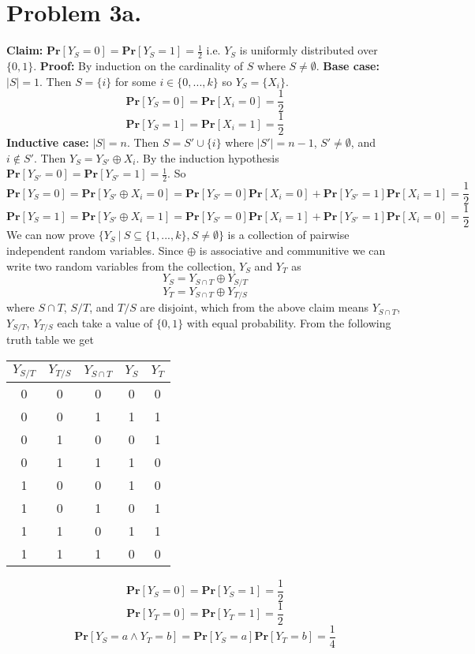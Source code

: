 \documentclass[12pt]{article}
\begin{document}
\section*{Problem 3a.}
\textbf{Claim:} $\textbf{Pr}[Y_S = 0] = \textbf{Pr}[Y_S = 1] = \frac{1}{2}$
i.e. $Y_S$ is uniformly distributed over $\{0,1\}$.
\vspace{2mm}
\newline
\textbf{Proof:} By induction on the cardinality of $S$ where $S \neq \emptyset$.
\newline
\textbf{Base case:} $|S| = 1$. Then $S = \{i\}$ for some $i \in \{0,...,k\}$
so $Y_S = \{X_i\}$.
$$\textbf{Pr}[Y_S = 0] = \textbf{Pr}[X_i = 0] = \frac{1}{2}$$
$$\textbf{Pr}[Y_S = 1] = \textbf{Pr}[X_i = 1] = \frac{1}{2}$$
\newline
\textbf{Inductive case:} $|S| = n$. Then $S = S' \cup \{i\}$ where
$|S'| = n-1$, $S' \neq \emptyset$, and $i \notin S'$. Then
$Y_S = Y_{S'} \oplus X_i$. By the induction hypothesis 
$\textbf{Pr}[Y_{S'} = 0] = \textbf{Pr}[Y_{S'} = 1] = \frac{1}{2}$.
So
$$\textbf{Pr}[Y_S = 0] = \textbf{Pr}[Y_{S'} \oplus X_i = 0] =
\textbf{Pr}[Y_{S'} = 0]\textbf{Pr}[X_i = 0] +
\textbf{Pr}[Y_{S'} = 1]\textbf{Pr}[X_i = 1] = \frac{1}{2}$$
$$\textbf{Pr}[Y_S = 1] = \textbf{Pr}[Y_{S'} \oplus X_i = 1] =
\textbf{Pr}[Y_{S'} = 0]\textbf{Pr}[X_i = 1] +
\textbf{Pr}[Y_{S'} = 1]\textbf{Pr}[X_i = 0] = \frac{1}{2}$$
\newline
We can now prove $\{Y_S\ |\ S\subseteq \{1,...,k\}, S\neq\emptyset \}$ is a
collection of pairwise independent random variables. Since $\oplus$ is
associative and communitive we can write two random variables from the
collection, $Y_S$ and $Y_T$ as
$$Y_S = Y_{S\cap T} \oplus Y_{S/T}$$
$$Y_T = Y_{S\cap T} \oplus Y_{T/S}$$
where $S\cap T$, $S/T$, and $T/S$ are disjoint, which from the above claim means
$Y_{S\cap T}$, $Y_{S/T}$, $Y_{T/S}$ each take a value of $\{0,1\}$ with equal
probability. From the following truth table we get
\begin{center}
\begin{tabular}{| c | c | c || c | c |}
\hline
$Y_{S/T}$ & $Y_{T/S}$ & $Y_{S\cap T}$ & $Y_S$ & $Y_T$ \\ \hline
0 & 0 & 0 & 0 & 0 \\ \hline
0 & 0 & 1 & 1 & 1 \\ \hline
0 & 1 & 0 & 0 & 1 \\ \hline
0 & 1 & 1 & 1 & 0 \\ \hline
1 & 0 & 0 & 1 & 0 \\ \hline
1 & 0 & 1 & 0 & 1 \\ \hline
1 & 1 & 0 & 1 & 1 \\ \hline
1 & 1 & 1 & 0 & 0 \\ \hline
\end{tabular}
\end{center}
$$\textbf{Pr}[Y_S = 0] = \textbf{Pr}[Y_S = 1] = \frac{1}{2}$$
$$\textbf{Pr}[Y_T = 0] = \textbf{Pr}[Y_T = 1] = \frac{1}{2}$$
$$\textbf{Pr}[Y_S = a \wedge Y_T = b] = \textbf{Pr}[Y_S = a]\textbf{Pr}[Y_T = b]
= \frac{1}{4}$$
\end{document}
